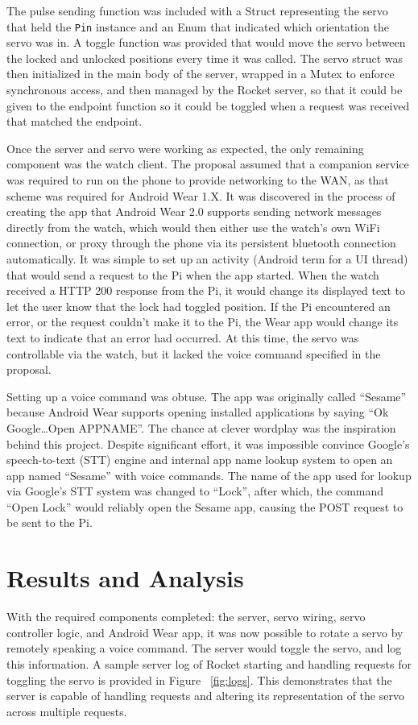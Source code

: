 \documentclass[a4paper]{article}
\begin{document}
The pulse sending function was included with a Struct representing the servo that held the \texttt{Pin} instance and an Enum that indicated which orientation the servo was in.
A toggle function was provided that would move the servo between the locked and unlocked positions every time it was called.
The servo struct was then initialized in the main body of the server, wrapped in a Mutex to enforce synchronous access, and then managed by the Rocket server, so that it could be given to the endpoint function so it could be toggled when a request was received that matched the endpoint.


Once the server and servo were working as expected, the only remaining component was the watch client.
The proposal assumed that a companion service was required to run on the phone to provide networking to the WAN, as that scheme was required for Android Wear 1.X.
It was discovered in the process of creating the app that Android Wear 2.0 supports sending network messages directly from the watch, which would then either use the watch's own WiFi connection, or proxy through the phone via its persistent bluetooth connection automatically.
It was simple to set up an activity (Android term for a UI thread) that would send a request to the Pi when the app started.
When the watch received a HTTP 200 response from the Pi, it would change its displayed text to let the user know that the lock had toggled position.
If the Pi encountered an error, or the request couldn't make it to the Pi, the Wear app would change its text to indicate that an error had occurred.
At this time, the servo was controllable via the watch, but it lacked the voice command specified in the proposal.

Setting up a voice command was obtuse.
The app was originally called ``Sesame'' because Android Wear supports opening installed applications by saying ``Ok Google\ldots Open APPNAME''.
The chance at clever wordplay was the inspiration behind this project.
Despite significant effort, it was impossible convince Google's speech-to-text (STT) engine and internal app name lookup system to open an app named ``Sesame'' with voice commands.
The name of the app used for lookup via Google's STT system was changed to ``Lock'', after which, the command ``Open Lock'' would reliably open the Sesame app, causing the POST request to be sent to the Pi.


\section{Results and Analysis}\label{sec:resultsAndAnalysis}
With the required components completed: the server, servo wiring, servo controller logic, and Android Wear app, it was now possible to rotate a servo by remotely speaking a voice command.
The server would toggle the servo, and log this information.
A sample server log of Rocket starting and handling requests for toggling the servo is provided in Figure ~\ref{fig:logs}.
This demonstrates that the server is capable of handling requests and altering its representation of the servo across multiple requests.
\end{document}
